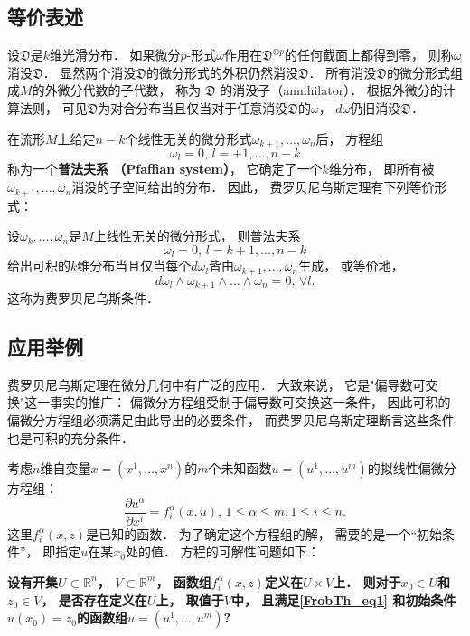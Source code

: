 \subsection{等价表述}
设$\mathfrak{D}$是$k$维光滑分布． 如果微分$p$-形式$\omega$作用在$\mathfrak{D}^{\otimes p}$的任何截面上都得到零， 则称$\omega$消没$\mathfrak{D}$． 显然两个消没$\mathfrak{D}$的微分形式的外积仍然消没$\mathfrak{D}$． 所有消没$\mathfrak{D}$的微分形式组成$M$的外微分代数的子代数， 称为 $\mathfrak{D}$ 的消没子（annihilator）． 根据外微分的计算法则， 可见$\mathfrak{D}$为对合分布当且仅当对于任意消没$\mathfrak{D}$的$\omega$， $d\omega$仍旧消没$\mathfrak{D}$． 

在流形$M$上给定$n-k$个线性无关的微分形式$\omega_{k+1},...,\omega_{n}$后， 方程组
$$
\omega_{l}=0,\,l=+1,...,n-k
$$
称为一个\textbf{普法夫系 （Pfaffian system）}， 它确定了一个$k$维分布， 即所有被$\omega_{k+1},...,\omega_{n}$消没的子空间给出的分布． 因此， 费罗贝尼乌斯定理有下列等价形式：
\begin{theorem}{}
设$\omega_{k},...,\omega_{n}$是$M$上线性无关的微分形式， 则普法夫系
$$
\omega_{l}=0,\,l=k+1,...,n-k
$$
给出可积的$k$维分布当且仅当每个$d\omega_l$皆由$\omega_{k+1},...,\omega_{n}$生成， 或等价地，
$$
d\omega_{l}\wedge\omega_{k+1}\wedge...\wedge\omega_{n}=0,\,\forall l.
$$
这称为费罗贝尼乌斯条件．
\end{theorem}

\subsection{应用举例}
费罗贝尼乌斯定理在微分几何中有广泛的应用． 大致来说， 它是"偏导数可交换"这一事实的推广： 偏微分方程组受制于偏导数可交换这一条件， 因此可积的偏微分方程组必须满足由此导出的必要条件， 而费罗贝尼乌斯定理断言这些条件也是可积的充分条件．

考虑$n$维自变量$x=(x^1,...,x^n)$的$m$个未知函数$u=(u^1,...,u^m)$的拟线性偏微分方程组：
\begin{equation}\label{FrobTh_eq1}
\frac{\partial u^\alpha}{\partial x^i}=f_i^\alpha(x,u),\,1\leq\alpha\leq m;1\leq i\leq n.
\end{equation}
这里$f_i^\alpha(x,z)$是已知的函数． 为了确定这个方程组的解， 需要的是一个“初始条件”， 即指定$u$在某$x_0$处的值． 方程的可解性问题如下：

\textbf{设有开集$U\subset\mathbb{R}^n$， $V\subset\mathbb{R}^m$， 函数组$f_i^\alpha(x,z)$定义在$U\times V$上． 则对于$x_0\in U$和$z_0\in V$， 是否存在定义在$U$上， 取值于$V$中， 且满足\autoref{FrobTh_eq1} 和初始条件$u(x_0)=z_0$的函数组$u=(u^1,...,u^m)$?}

